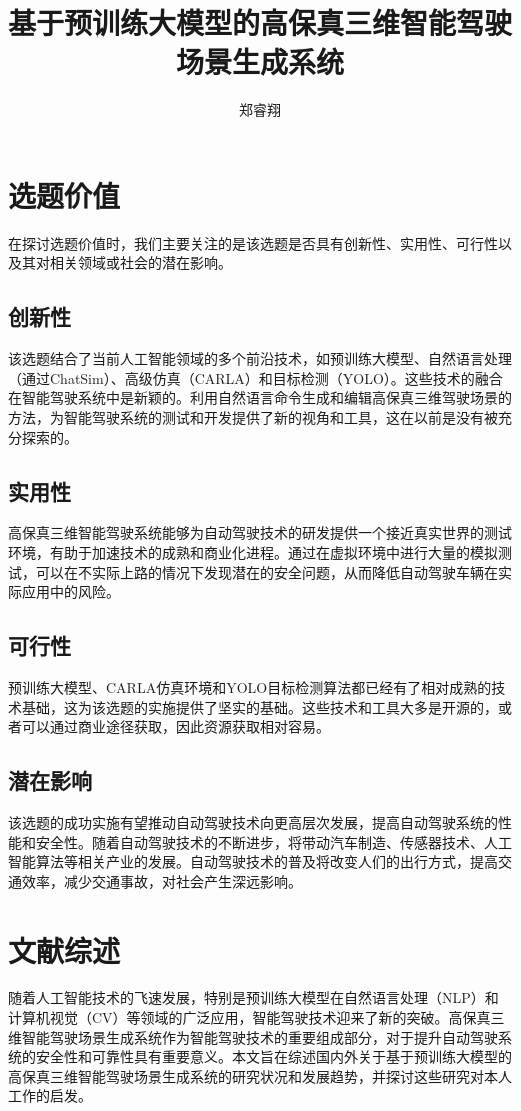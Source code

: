 \documentclass{article}
\title{基于预训练大模型的高保真三维智能驾驶场景生成系统}
\author{郑睿翔}
\begin{document}
\section*{选题价值}

在探讨选题价值时，我们主要关注的是该选题是否具有创新性、实用性、可行性以及其对相关领域或社会的潜在影响。

\subsection*{创新性}
该选题结合了当前人工智能领域的多个前沿技术，如预训练大模型、自然语言处理（通过ChatSim）、高级仿真（CARLA）和目标检测（YOLO）。这些技术的融合在智能驾驶系统中是新颖的。利用自然语言命令生成和编辑高保真三维驾驶场景的方法，为智能驾驶系统的测试和开发提供了新的视角和工具，这在以前是没有被充分探索的。

\subsection*{实用性}
高保真三维智能驾驶系统能够为自动驾驶技术的研发提供一个接近真实世界的测试环境，有助于加速技术的成熟和商业化进程。通过在虚拟环境中进行大量的模拟测试，可以在不实际上路的情况下发现潜在的安全问题，从而降低自动驾驶车辆在实际应用中的风险。

\subsection*{可行性}
预训练大模型、CARLA仿真环境和YOLO目标检测算法都已经有了相对成熟的技术基础，这为该选题的实施提供了坚实的基础。这些技术和工具大多是开源的，或者可以通过商业途径获取，因此资源获取相对容易。

\subsection*{潜在影响}
该选题的成功实施有望推动自动驾驶技术向更高层次发展，提高自动驾驶系统的性能和安全性。随着自动驾驶技术的不断进步，将带动汽车制造、传感器技术、人工智能算法等相关产业的发展。自动驾驶技术的普及将改变人们的出行方式，提高交通效率，减少交通事故，对社会产生深远影响。


\section{文献综述}
随着人工智能技术的飞速发展，特别是预训练大模型在自然语言处理（NLP）和计算机视觉（CV）等领域的广泛应用，智能驾驶技术迎来了新的突破。高保真三维智能驾驶场景生成系统作为智能驾驶技术的重要组成部分，对于提升自动驾驶系统的安全性和可靠性具有重要意义。本文旨在综述国内外关于基于预训练大模型的高保真三维智能驾驶场景生成系统的研究状况和发展趋势，并探讨这些研究对本人工作的启发。
\end{document}
